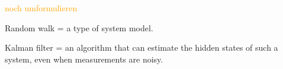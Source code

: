 \textcolor{orange}{noch umformulieren}









Random walk = a type of system model.

Kalman filter = an algorithm that can estimate the hidden states of such a system, even when measurements are noisy.
